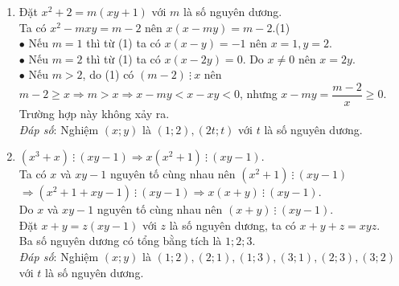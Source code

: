 \begin{bt}
{\begin{enumerate}
  $\bullet$ Xét $a=5$, thay vào (2) được $(11+2b)\ \vdots \ 5b$ nên $11\ \vdots \ b$. Do $b\leq a=5$ nên $b=1$, không thỏa mãn (2).\\
  $\bullet$ Xét $a=7$, thay vào (2) được $(15+2b)\ \vdots \ 7b$ nên $15\ \vdots \ b$. Do $b\leq a=7$ nên $b\in\{1;3;5\}$. Thử vào (2) chỉ có $b=3$ thỏa mãn.\\
  \emph{Đáp số}: Nghiệm $(x;y)$ là $(2;2), (4;2), (2;4), (8;4), (4;8)$.
  \item Đặt $x^2+2=m(xy+1)$ với $m$ là số nguyên dương.\\
  Ta có $x^2-mxy=m-2$ nên $x(x-my)=m-2$.\hfill (1)\\
  $\bullet$ Nếu $m=1$ thì từ (1) ta có $x(x-y)=-1$ nên $x=1, y=2$.\\
  $\bullet$ Nếu $m=2$ thì từ (1) ta có $x(x-2y)=0$. Do $x\neq 0$ nên $x=2y$.\\
  $\bullet$ Nếu $m>2$, do (1) có $(m-2)\ \vdots \ x$ nên $m-2\geq x\Rightarrow m>x\Rightarrow x-my<x-xy<0$, nhưng $x-my=\dfrac{m-2}{x}\geq 0$. Trường hợp này không xảy ra.\\
  \emph{Đáp số}: Nghiệm $(x;y)$ là $(1;2), (2t;t)$ với $t$ là số nguyên dương.
  \item $(x^3+x) \ \vdots \ (xy-1) \Rightarrow x(x^2+1) \ \vdots \ (xy-1)$.\\
  Ta có $x$ và $xy-1$ nguyên tố cùng nhau nên $(x^2+1)\ \vdots \ (xy-1)$\\
  $\Rightarrow (x^2+1+xy-1)\ \vdots \ (xy-1)\Rightarrow x(x+y)\ \vdots \ (xy-1)$.\\
  Do $x$ và $xy-1$ nguyên tố cùng nhau nên $(x+y)\ \vdots \ (xy-1)$.\\
  Đặt $x+y=z(xy-1)$ với $z$ là số nguyên dương, ta có $x+y+z=xyz$.\\
  Ba số nguyên dương có tổng bằng tích là $1; 2; 3$.\\
  \emph{Đáp số}: Nghiệm $(x;y)$ là $(1;2), (2;1), (1;3), (3;1), (2;3), (3;2)$ với $t$ là số nguyên dương.
\end{enumerate}
}
\end{bt}


